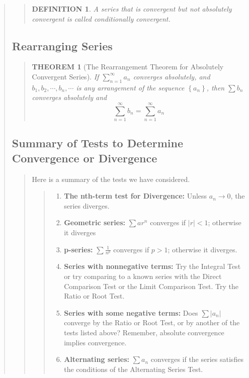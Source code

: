 \documentclass{report}
\newtheorem{theorem}{THEOREM}
\newtheorem*{definition}{DEFINITION}
\begin{document}
\begin{quote}
\begin{quote}
		\begin{definition}
		A series that is convergent but not absolutely convergent is called conditionally convergent.
		\end{definition}

	\end{quote}

	\subsection{Rearranging Series}
	\begin{quote}
		\begin{theorem}[The Rearrangement Theorem for Absolutely Convergent Series]
			\mbox{}\par

			If $\sum_{n=1}^{\infty}a_n$ converges absolutely, and $b_1, b_2, \cdots, b_n, \cdots$ is any arrangement of the sequence $\left \{ a_n \right \}$, then $\sum b_n$ converges absolutely and
			$$\sum_{n=1}^{\infty} b_n = \sum_{n=1}^{\infty}a_n$$

		\end{theorem}
	\end{quote}

	\subsection{Summary of Tests to Determine Convergence or Divergence}
	\begin{quote}

		Here is a summary of the tests we have considered.

		\begin{quote}
			
			\newpage
			
			\begin{enumerate}
				\item \textbf{The nth-term test for Divergence:} Unless $a_n \to 0$, the series diverges.
				\item \textbf{Geometric series:}                 $\sum ar^n$ converges if $\left | r \right |<1$; otherwise it diverges
				\item \textbf{p-series:}                         $\sum \frac{1}{n^p}$ converges if $p>1$; otherwise it diverges.
				\item \textbf{Series with nonnegative terms:}    Try the Integral Test or try comparing to a known series with the Direct Comparison Test or the Limit Comparison Test. Try the Ratio or Root Test.
				\item \textbf{Series with some negative terms:}  Does $\sum \left | a_n \right |$ converge by the Ratio or Root Test, or by another of the tests listed above? Remember, absolute convergence implies convergence.
				\item \textbf{Alternating series: }              $\sum a_n$ converges if the series satisfies the conditions of the Alternating Series Test.
			\end{enumerate}


\end{quote}
\end{quote}
\end{quote}
\end{document}
